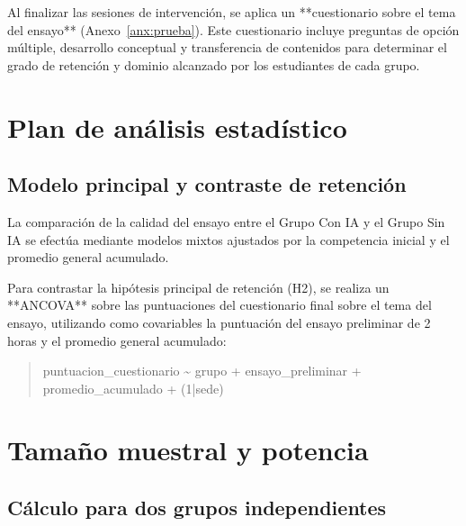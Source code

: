 \documentclass[12pt,a4paper,openany]{report}
\begin{document}
    Al finalizar las sesiones de intervenci\'on, se aplica un **cuestionario sobre el tema del ensayo** (Anexo~\ref{anx:prueba}). Este cuestionario incluye preguntas de opci\'on m\'ultiple, desarrollo conceptual y transferencia de contenidos para determinar el grado de retenci\'on y dominio alcanzado por los estudiantes de cada grupo.
    
    \chapter{Plan de an\'alisis estad\'istico}
    \label{cap:analisis}
    
    \section{Modelo principal y contraste de retenci\'on}
    
    La comparaci\'on de la calidad del ensayo entre el Grupo Con IA y el Grupo Sin IA se efect\'ua mediante modelos mixtos ajustados por la competencia inicial y el promedio general acumulado.
    
    Para contrastar la hip\'otesis principal de retenci\'on (H2), se realiza un **ANCOVA** sobre las puntuaciones del cuestionario final sobre el tema del ensayo, utilizando como covariables la puntuaci\'on del ensayo preliminar de 2 horas y el promedio general acumulado:
    
    \begin{quote}
        \ttfamily\small
        puntuacion\_cuestionario \textasciitilde{} grupo + ensayo\_preliminar + promedio\_acumulado + (1|sede)
    \end{quote}
    
    \chapter{Tama\~no muestral y potencia}
    \label{cap:potencia}
    
    \section{C\'alculo para dos grupos independientes}
    
\end{document}

